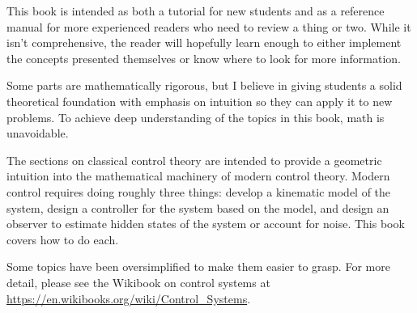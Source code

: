 This book is intended as both a tutorial for new students and as a reference
manual for more experienced readers who need to review a thing or two. While it
isn't comprehensive, the reader will hopefully learn enough to either implement
the concepts presented themselves or know where to look for more information.

Some parts are mathematically rigorous, but I believe in giving students a solid
theoretical foundation with emphasis on intuition so they can apply it to new
problems. To achieve deep understanding of the topics in this book, math is
unavoidable.

The sections on classical control theory are intended to provide a geometric
intuition into the mathematical machinery of modern control theory. Modern
control requires doing roughly three things: develop a kinematic model of the
system, design a controller for the system based on the model, and design an
observer to estimate hidden states of the system or account for noise. This book
covers how to do each.

Some topics have been oversimplified to make them easier to grasp. For more
detail, please see the Wikibook on control systems at
\url{https://en.wikibooks.org/wiki/Control_Systems}.
